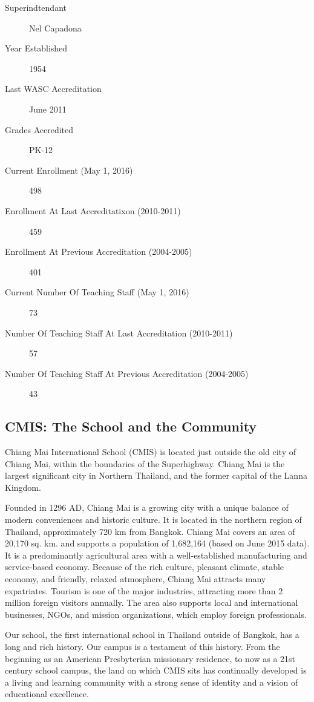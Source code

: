 \begin{description}
\item[Superindtendant]
Nel Capadona
\item[Year Established]
1954
\item[Last WASC Accreditation]June 2011
\item[Grades Accredited]PK-12
\item[Current Enrollment (May 1, 2016)] 498
\item[Enrollment At Last Accreditatixon (2010-2011)] 459
\item[Enrollment At Previous Accreditation (2004-2005)]401
\item[Current Number Of Teaching Staff (May 1, 2016)]73
\item[Number Of Teaching Staff At Last Accreditation (2010-2011)]57
\item[Number Of Teaching Staff At Previous Accreditation (2004-2005)]43
\end{description}


\subsection{CMIS: The School and the Community}


Chiang Mai International School (CMIS) is located just outside the old city of Chiang Mai, within the boundaries of the Superhighway. Chiang Mai is the largest significant city in Northern Thailand, and the former capital of the Lanna Kingdom.  

Founded in 1296 AD, Chiang Mai is a growing city with a unique balance of modern conveniences and historic culture.  It is located in the northern region of Thailand, approximately 720 km from Bangkok.  Chiang Mai covers an area of 20,170 sq. km. and supports a population of 1,682,164 (based on June 2015 data).  It is a predominantly agricultural area with a well-established manufacturing and service-based economy.  Because of the rich culture, pleasant climate, stable economy, and friendly, relaxed atmosphere, Chiang Mai attracts many expatriates.  Tourism is one of the major industries, attracting more than 2 million foreign visitors annually.  The area also supports local and international businesses, NGOs, and mission organizations, which employ foreign professionals.

Our school, the first international school in Thailand outside of Bangkok, has a long and rich history.  Our campus is a testament of this history.  From the beginning as an American Presbyterian missionary residence, to now as a 21st century school campus, the land on which CMIS sits has continually developed is a living and learning community with a strong sense of identity and a vision of educational excellence.  

